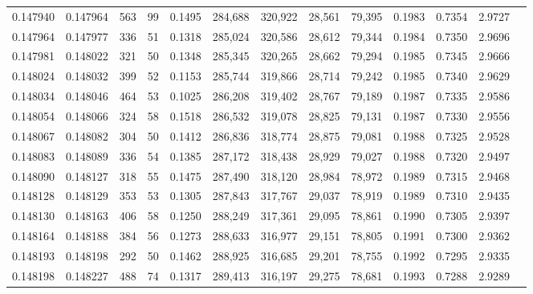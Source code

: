 \begin{tabular}{rrrrrrrrrrrrr}
0.147940 & 0.147964 &   563 &  99 &                                     0.1495 & 284,688 & 320,922 &  28,561 &  79,395 & 0.1983 & 0.7354 & 2.9727 \\
0.147964 & 0.147977 &   336 &  51 &                                     0.1318 & 285,024 & 320,586 &  28,612 &  79,344 & 0.1984 & 0.7350 & 2.9696 \\
0.147981 & 0.148022 &   321 &  50 &                                     0.1348 & 285,345 & 320,265 &  28,662 &  79,294 & 0.1985 & 0.7345 & 2.9666 \\
0.148024 & 0.148032 &   399 &  52 &                                     0.1153 & 285,744 & 319,866 &  28,714 &  79,242 & 0.1985 & 0.7340 & 2.9629 \\
0.148034 & 0.148046 &   464 &  53 &                                     0.1025 & 286,208 & 319,402 &  28,767 &  79,189 & 0.1987 & 0.7335 & 2.9586 \\
0.148054 & 0.148066 &   324 &  58 &                                     0.1518 & 286,532 & 319,078 &  28,825 &  79,131 & 0.1987 & 0.7330 & 2.9556 \\
0.148067 & 0.148082 &   304 &  50 &                                     0.1412 & 286,836 & 318,774 &  28,875 &  79,081 & 0.1988 & 0.7325 & 2.9528 \\
0.148083 & 0.148089 &   336 &  54 &                                     0.1385 & 287,172 & 318,438 &  28,929 &  79,027 & 0.1988 & 0.7320 & 2.9497 \\
0.148090 & 0.148127 &   318 &  55 &                                     0.1475 & 287,490 & 318,120 &  28,984 &  78,972 & 0.1989 & 0.7315 & 2.9468 \\
0.148128 & 0.148129 &   353 &  53 &                                     0.1305 & 287,843 & 317,767 &  29,037 &  78,919 & 0.1989 & 0.7310 & 2.9435 \\
0.148130 & 0.148163 &   406 &  58 &                                     0.1250 & 288,249 & 317,361 &  29,095 &  78,861 & 0.1990 & 0.7305 & 2.9397 \\
0.148164 & 0.148188 &   384 &  56 &                                     0.1273 & 288,633 & 316,977 &  29,151 &  78,805 & 0.1991 & 0.7300 & 2.9362 \\
0.148193 & 0.148198 &   292 &  50 &                                     0.1462 & 288,925 & 316,685 &  29,201 &  78,755 & 0.1992 & 0.7295 & 2.9335 \\
0.148198 & 0.148227 &   488 &  74 &                                     0.1317 & 289,413 & 316,197 &  29,275 &  78,681 & 0.1993 & 0.7288 & 2.9289 \\

\end{tabular}
